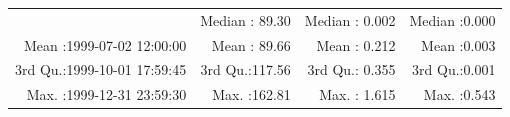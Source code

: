 \documentclass[
  10pt,
  a4paper,oneside]{article}
\begin{document}
\begin{longtable}[]{@{}rrrr@{}}
\begin{minipage}[t]{0.33\columnwidth}
\end{minipage} & \begin{minipage}[t]{0.19\columnwidth}\raggedleft
Median : 89.30\strut
\end{minipage} & \begin{minipage}[t]{0.19\columnwidth}\raggedleft
Median : 0.002\strut
\end{minipage} & \begin{minipage}[t]{0.19\columnwidth}\raggedleft
Median :0.000\strut
\end{minipage}\tabularnewline
\begin{minipage}[t]{0.33\columnwidth}\raggedleft
Mean :1999-07-02 12:00:00\strut
\end{minipage} & \begin{minipage}[t]{0.19\columnwidth}\raggedleft
Mean : 89.66\strut
\end{minipage} & \begin{minipage}[t]{0.19\columnwidth}\raggedleft
Mean : 0.212\strut
\end{minipage} & \begin{minipage}[t]{0.19\columnwidth}\raggedleft
Mean :0.003\strut
\end{minipage}\tabularnewline
\begin{minipage}[t]{0.33\columnwidth}\raggedleft
3rd Qu.:1999-10-01 17:59:45\strut
\end{minipage} & \begin{minipage}[t]{0.19\columnwidth}\raggedleft
3rd Qu.:117.56\strut
\end{minipage} & \begin{minipage}[t]{0.19\columnwidth}\raggedleft
3rd Qu.: 0.355\strut
\end{minipage} & \begin{minipage}[t]{0.19\columnwidth}\raggedleft
3rd Qu.:0.001\strut
\end{minipage}\tabularnewline
\begin{minipage}[t]{0.33\columnwidth}\raggedleft
Max. :1999-12-31 23:59:30\strut
\end{minipage} & \begin{minipage}[t]{0.19\columnwidth}\raggedleft
Max. :162.81\strut
\end{minipage} & \begin{minipage}[t]{0.19\columnwidth}\raggedleft
Max. : 1.615\strut
\end{minipage} & \begin{minipage}[t]{0.19\columnwidth}\raggedleft
Max. :0.543\strut
\end{minipage}\tabularnewline

\end{longtable}
\end{document}
